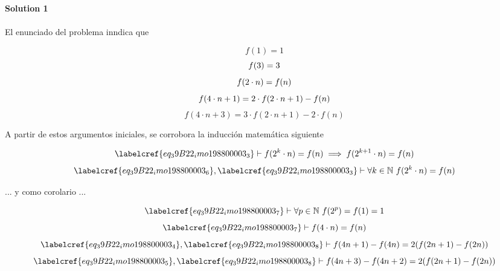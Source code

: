 \noindent\textbf{Solution 1} \\\\

El enunciado del problema inndica que

\begin{equation} \label{eq_39B22_imo198800003_1}
	f(1) = 1
\end{equation}
\begin{equation} \label{eq_39B22_imo198800003_2}
f(3) = 3 \\
\end{equation}
\begin{equation} \label{eq_39B22_imo198800003_3}
f(2 \cdot n) = f(n)\\
\end{equation}
\begin{equation} \label{eq_39B22_imo198800003_4}
f(4 \cdot n + 1) = 2 \cdot f(2 \cdot n + 1) - f(n) \\
\end{equation}
\begin{equation} \label{eq_39B22_imo198800003_5}
f(4 \cdot n + 3) = 3 \cdot f(2 \cdot n + 1) - 2 \cdot f(n)
\end{equation}

A partir de estos argumentos iniciales, se corrobora la inducción matemática siguiente

\begin{equation} \label{eq_39B22_imo198800003_6}
	\labelcref{eq_39B22_imo198800003_3} \vdash f(2^k \cdot n) = f(n) \implies  f(2^{k+1} \cdot n) = f(n)
\end{equation}
\begin{equation} \label{eq_39B22_imo198800003_7}
	\labelcref{eq_39B22_imo198800003_6}, \labelcref{eq_39B22_imo198800003_3} \vdash \forall k \in \mathbb{N}\ f(2^k \cdot n) = f(n)
\end{equation}

... y como corolario ...

\begin{equation} \label{eq_39B22_imo198800003_8a}
	\labelcref{eq_39B22_imo198800003_7} \vdash \forall p \in \mathbb{N}\ f(2^p) = f(1)= 1
\end{equation}
\begin{equation} \label{eq_39B22_imo198800003_8}
	\labelcref{eq_39B22_imo198800003_7} \vdash f(4 \cdot n) = f(n)
\end{equation}
\begin{equation} \label{eq_39B22_imo198800003_9}
	\labelcref{eq_39B22_imo198800003_4}, \labelcref{eq_39B22_imo198800003_8} \vdash f(4n + 1)-f(4n) = 2(f(2n + 1) - f(2n))
\end{equation}
\begin{equation} \label{eq_39B22_imo198800003_10}
	\labelcref{eq_39B22_imo198800003_5}, \labelcref{eq_39B22_imo198800003_8} \vdash f(4n + 3)-f(4n+2) = 2(f(2n + 1) - f(2n))
\end{equation}

